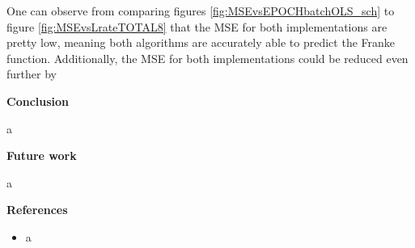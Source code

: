 \documentclass[12pt,a4paper]{article}
\begin{document}
One can observe from comparing figures \ref{fig:MSEvsEPOCHbatchOLS_sch} to figure \ref{fig:MSEvsLrateTOTAL8} that the MSE for both implementations are pretty low, meaning both algorithms are accurately able to predict the Franke function. Additionally, the MSE for both implementations could be reduced even further by 

\newpage

\begin{center}
\Large{\textbf{Conclusion}}
\end{center}

\noindent a

\newpage

\begin{center}
\Large{\textbf{Future work}}
\end{center}

\noindent a

\newpage

\begin{center}
\Large{\textbf{References}}
\end{center}

\begin{itemize}
  \item a
\end{itemize}
\end{document}
